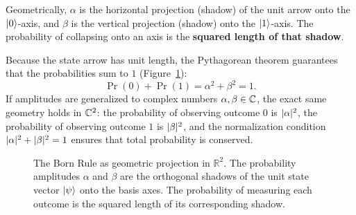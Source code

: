 Geometrically, $\alpha$ is the horizontal projection (shadow) of the unit arrow onto
the $\lvert 0 \rangle$-axis, and $\beta$ is the vertical projection (shadow) onto the
$\lvert 1 \rangle$-axis. The probability of collapsing onto an axis is the \textbf{squared
length of that shadow}.

Because the state arrow has unit length, the Pythagorean theorem guarantees that the
probabilities sum to $1$ (Figure~\ref{ch42:fig-born-rule}):
\[
  \Pr(0) + \Pr(1) = \alpha^2 + \beta^2 = 1.
\]
If amplitudes are generalized to complex numbers $\alpha, \beta \in \mathbb{C}$, the exact
same geometry holds in $\mathbb{C}^2$: the probability of observing outcome $0$ is
$\lvert\alpha\rvert^2$, the probability of observing outcome $1$ is $\lvert\beta\rvert^2$, and
the normalization condition $\lvert\alpha\rvert^2 + \lvert\beta\rvert^2 = 1$ ensures that total
probability is conserved.


\begin{figure}[htbp]
\centering
{}
\caption{The Born Rule as geometric projection in $\mathbb{R}^2$. The probability amplitudes $\alpha$ and $\beta$ are the orthogonal shadows of the unit state vector $\lvert \psi \rangle$ onto the basis axes. The probability of measuring each outcome is the squared length of its corresponding shadow.}
\label{ch42:fig-born-rule}
\end{figure}


